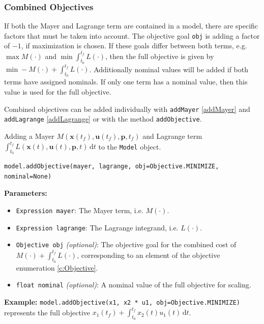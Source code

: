 \documentclass[12pt]{article}
\renewcommand{\v}{\bm}
\begin{document}
	\subsubsection{Combined Objectives}
	
	If both the Mayer and Lagrange term are contained in a model, there are specific factors that must be taken into account. The objective goal \texttt{obj} is adding a factor of $-1$, if maximization is chosen. If these goals differ between both terms, e.g. $\max M(\cdot)$ and $\min  \int_{t_0}^{t_f} L(\cdot)$, then the full objective is given by $\min -M(\cdot) +  \int_{t_0}^{t_f} L(\cdot)$. Additionally nominal values will be added if both terms have assigned nominals. If only one term has a nominal value, then this value is used for the full objective.
	
	Combined objectives can be added individually with \texttt{addMayer} \ref{addMayer} and \texttt{addLagrange} \ref{addLagrange} or with the method \texttt{addObjective}.
	
	
	
	\begin{mdframed}[backgroundcolor=gray!10, roundcorner=10pt, linewidth=1pt]
		
		Adding a Mayer $M(\v{x}(t_f), \v{u}(t_f), \v{p}, t_f)$ and Lagrange term $\int_{t_0}^{t_f} L(\v{x}(t), \v{u}(t), \v{p}, t) \, \mathrm{d}t$ to the \texttt{Model} object.
		
		\begin{lstlisting}
model.addObjective(mayer, lagrange, obj=Objective.MINIMIZE, nominal=None)
		\end{lstlisting}
		\label{addObjective}
		\textbf{Parameters:}
		\begin{itemize} 
			\item \texttt{Expression mayer}: The Mayer term, i.e. $M(\cdot)$.
			\item \texttt{Expression lagrange}: The Lagrange integrand, i.e. $L(\cdot)$.
			\item \texttt{Objective obj} \emph{(optional)}: The objective goal for the combined cost of $M(\cdot) +  \int_{t_0}^{t_f} L(\cdot)$, corresponding to an element of the objective enumeration \ref{c:Objective}.
			\item \texttt{float nominal} \emph{(optional)}: A nominal value of the full objective for scaling.
		\end{itemize}
		
		\textbf{Example:} \texttt{model.addObjective(x1, x2 * u1, obj=Objective.MINIMIZE)} represents the full objective
		$x_1(t_f) + \int_{t_0}^{t_f} x_2(t) u_1(t) \, \mathrm{d}t$.
	\end{mdframed}
\end{document}
